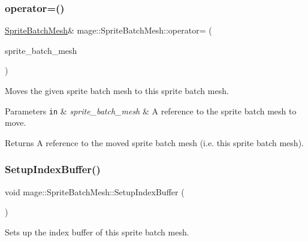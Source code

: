 \subsubsection{\texorpdfstring{operator=()}{operator=()}\hspace{0.1cm}{\footnotesize\ttfamily [2/2]}}
{\footnotesize\ttfamily \hyperlink{classmage_1_1_sprite_batch_mesh}{Sprite\+Batch\+Mesh}\& mage\+::\+Sprite\+Batch\+Mesh\+::operator= (\begin{DoxyParamCaption}\item[{\hyperlink{classmage_1_1_sprite_batch_mesh}{Sprite\+Batch\+Mesh} \&\&}]{sprite\+\_\+batch\+\_\+mesh }\end{DoxyParamCaption})\hspace{0.3cm}{\ttfamily [delete]}}

Moves the given sprite batch mesh to this sprite batch mesh.


\begin{DoxyParams}[1]{Parameters}
\mbox{\tt in}  & {\em sprite\+\_\+batch\+\_\+mesh} & A reference to the sprite batch mesh to move. \\
\hline
\end{DoxyParams}
\begin{DoxyReturn}{Returns}
A reference to the moved sprite batch mesh (i.\+e. this sprite batch mesh). 
\end{DoxyReturn}
\hypertarget{classmage_1_1_sprite_batch_mesh_a628ab5a3dd2df0c624b7dc99bcff7f98}{}\label{classmage_1_1_sprite_batch_mesh_a628ab5a3dd2df0c624b7dc99bcff7f98} 
\subsubsection{\texorpdfstring{Setup\+Index\+Buffer()}{SetupIndexBuffer()}}
{\footnotesize\ttfamily void mage\+::\+Sprite\+Batch\+Mesh\+::\+Setup\+Index\+Buffer (\begin{DoxyParamCaption}{ }\end{DoxyParamCaption})\hspace{0.3cm}{\ttfamily [private]}}

Sets up the index buffer of this sprite batch mesh. \hypertarget{classmage_1_1_sprite_batch_mesh_ad3b68ac00e3dfb09ed495ce66f1d6fda}{}\label{classmage_1_1_sprite_batch_mesh_ad3b68ac00e3dfb09ed495ce66f1d6fda} 
